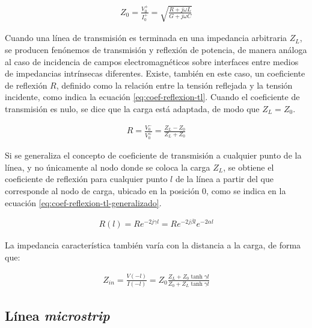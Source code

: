 \begin{align}
	\label{eq:TL-impedancia-caracteristica}
	Z_0 = \frac{V_0^+}{I_0^+} = \sqrt{\frac{R+j\omega L}{G+j\omega C}}
\end{align}

Cuando una línea de transmisión es terminada en una impedancia arbitraria $Z_L$, se producen fenónemos de transmisión y reflexión de potencia, de manera análoga al caso de incidencia de campos electromagnéticos sobre interfaces entre medios de impedancias intrínsecas diferentes. Existe, también en este caso, un coeficiente de reflexión $R$, definido como la relación entre la tensión reflejada y la tensión incidente, como indica la ecuación \ref{eq:coef-reflexion-tl}. Cuando el coeficiente de transmisión es nulo, se dice que la carga está adaptada, de modo que $Z_L = Z_0$.

\begin{align}
	\label{eq:coef-reflexion-tl}
	R = \frac{V_0^-}{V_0^+} = \frac{Z_L-Z_0}{Z_L+Z_0}
\end{align}

Si se generaliza el concepto de coeficiente de transmisión a cualquier punto de la línea, y no únicamente al nodo donde se coloca la carga $Z_L$, se obtiene el coeficiente de reflexión para cualquier punto $l$ de la línea a partir del que corresponde al nodo de carga, ubicado en la posición 0, como se indica en la ecuación \ref{eq:coef-reflexion-tl-generalizado}.

\begin{align}
\label{eq:coef-reflexion-tl-generalizado}
R(l) = Re^{-2j\gamma l} = R e^{-2j\beta l} e^{-2\alpha l}
\end{align}

La impedancia característica también varía con la distancia a la carga, de forma que:

\begin{align}
Z_{in} = \frac{V(-l)}{I(-l)} = Z_0 \frac{Z_L +Z_0 \tanh \gamma l}{Z_0 + Z_L \tanh \gamma l}
\end{align}
\subsection{Línea \textit{microstrip}}

